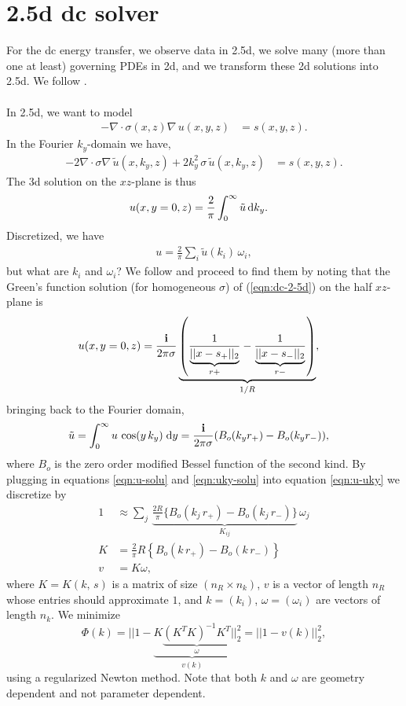 \documentclass[a4paper,12pt]{article}
\begin{document}
\section*{2.5d dc solver}
For the dc energy transfer, we observe data in 2.5d, we solve many (more than one at least) governing PDEs in 2d, and we transform these 2d solutions into 2.5d. We follow \cite{pidlisecky2008fw2_5d}.
\\\\
In 2.5d, we want to model
\begin{align}
-\nabla\cdot\sigma(x,z)\nabla\,u(x,y,z) &= s(x,y,z).
\label{eqn:dc-2-5d}
\end{align}
In the Fourier $k_y$-domain we have,
\begin{align}
-2\nabla\cdot\sigma\nabla\,\tilde{u}(x,k_y,z) + 2 k_y^2\,\sigma\,\tilde{u}(x,k_y,z) &= s(x,y,z).
\end{align}
The 3d solution on the $xz$-plane is thus
\begin{align}
u(x,y=0,z) &= \frac{2}{\pi}\int_0^\infty \tilde{u}\,{\rm d}k_y.
\end{align}
Discretized, we have
\begin{align}
u = \frac{2}{\pi}\sum_i \tilde{u}(k_{i})\,\omega_i,
\label{eqn:u-uky}
\end{align}
but what are $k_{i}$ and $\omega_i$? We follow \cite{pidlisecky2008fw2_5d} and proceed to find them by noting that the Green's function solution (for homogeneous $\sigma$) of (\ref{eqn:dc-2-5d}) on the half $xz$-plane is 
\begin{align}
u(x,y=0,z) &= \frac{{\bf i}}{2\pi\sigma}
\underbrace{\left(\frac{1}{\underbrace{||x-s_+||_2}_{r+}} - \frac{1}{\underbrace{||x-s_-||_2}_{r-}}\right)}_{1/R},
\label{eqn:u-solu}
\end{align}
bringing back to the Fourier domain,
\begin{align}
\tilde{u} &= \int_0^\infty u\,\cos(y\,k_y)\;{\rm d}y = \frac{{\bf i}}{2\pi\sigma}(B_o(k_y r_{+}) - B_o(k_y r_{-})),
\label{eqn:uky-solu}
\end{align}
where $B_o$ is the zero order modified Bessel function of the second kind. By plugging in equations \ref{eqn:u-solu} and \ref{eqn:uky-solu} into equation \ref{eqn:u-uky} we discretize by 
\begin{align}
1&\approx \sum_j \, \underbrace{\frac{2R}{\pi}\{B_o(k_j\,r_+) - B_o(k_j\,r_-)\}}_{K_{ij}} \,\omega_j \\
K &= \frac{2}{\pi}R\left\{ B_o(k\,r_+) - B_o(k\,r_-) \right\} \\
v &= K\omega,
\label{eqn:Kwv}
\end{align}
where $K=K(k,\,s)$ is a matrix of size $(n_R\times n_k)$, $v$ is a vector of length $n_R$ whose entries should approximate $1$, and $k=(k_{i})$, $\omega=(\omega_i)$ are vectors of length $n_k$. We minimize
\[
\Phi(k) = || 1 - \underbrace{K\underbrace{(K^TK)^{-1}K^T}_{\omega}}_{v(k)} ||_2^2 = 
||1-v(k)||_2^2,
\]
using a regularized Newton method. Note that both $k$ and $\omega$ are geometry dependent and not parameter dependent.
\end{document}
